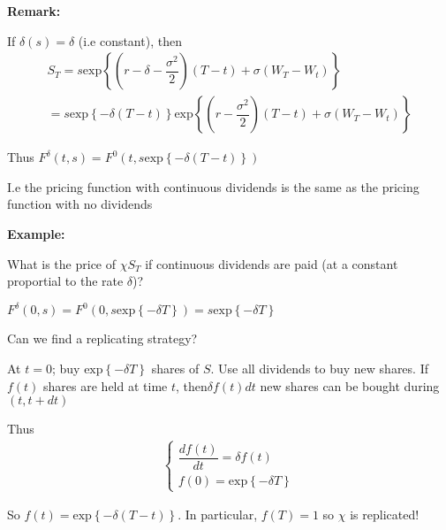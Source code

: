 \par\bigskip
\noindent\textbf{Remark:}\par
\noindent If $\delta(s) =\delta$ (i.e constant), then
\begin{equation*}
  \begin{gathered}
    S_T = s\text{exp}\left\{\left(r-\delta-\dfrac{\sigma^2}{2}\right)(T-t)+\sigma(W_T-W_t)\right\}\\
    = s\text{exp}\left\{-\delta(T-t)\right\}\text{exp}\left\{\left(r-\dfrac{\sigma^2}{2}\right)(T-t)+\sigma(W_T-W_t)\right\}
  \end{gathered}
\end{equation*}\par
\noindent Thus $F^\delta(t,s) = F^0(t,s\text{exp}\left\{-\delta(T-t)\right\})$\par
\noindent I.e the pricing function with continuous dividends is the same as the pricing function with no dividends
\par\bigskip
\noindent\textbf{Example:}\par
\noindent What is the price of $\chi S_T$ if continuous dividends are paid (at a constant proportial to the rate $\delta$)?\par
\noindent $F^\delta(0,s) = F^0(0,s\text{exp}\left\{-\delta T\right\}) =s\text{exp}\left\{-\delta T\right\}$
\par\bigskip
\noindent Can we find a replicating strategy?\par
\noindent At $t=0$; buy $\text{exp}\left\{-\delta T\right\}$ shares of $S$. Use all dividends to buy new shares. If $f(t)$ shares are held at time $t$, then$\delta f(t)dt$ new shares can be bought during $(t,t+dt)$\par
\noindent Thus
\begin{equation*}
  \begin{gathered}
    \begin{cases}
      \dfrac{df(t)}{dt} = \delta f(t)\\
      f(0) = \text{exp}\left\{-\delta T\right\}
    \end{cases}
  \end{gathered}
\end{equation*}\par
\noindent So $f(t) = \text{exp}\left\{-\delta(T-t)\right\}$. In particular, $f(T) = 1$ so $\chi$ is replicated!
